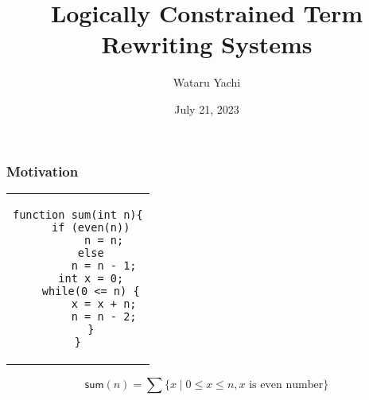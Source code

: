 \documentclass[12pt,aspectratio=169]{beamer}
\title{ Logically Constrained Term Rewriting Systems }
\author{Wataru Yachi}
\institute{JAIST}
\date{July 21, 2023}
\newcommand{\m}[1]{\mathsf{#1}}
\begin{document}
\maketitle

\begin{comment}
\begin{frame}
    \frametitle{If Treat Integers in Rules}

    \begin{example}
        for every $n,m,k \in \mathbb{Z}$
        \begin{tabular}{lcl}
            $\m{add}(\m{m}, \m{n}) \to k$ & if & $k = m + n$ \\
            $\m{even}(\m{n}) \to \m{true}$  & if & $n$ is even number\\
            $\m{even}(\m{n}) \to \m{false}$ & if & $n$ is not even number
            \end{tabular}
    \end{example}
\end{frame}
\end{comment}

\begin{frame}[fragile]
    \frametitle{Motivation}

\begin{center}
\begin{tabular}{c}
\begin{lstlisting}
function sum(int n){
    if (even(n))
        n = n;
    else
        n = n - 1;
    int x = 0;
    while(0 <= n) {
        x = x + n;
        n = n - 2;
    }
}
\end{lstlisting}
\end{tabular}
\end{center}
    \[
        \m{sum}(n) = \sum \{ x \mid 0 \leq x \leq n, \text{$x$ is even number}\}
    \]
\end{frame}
\end{document}
